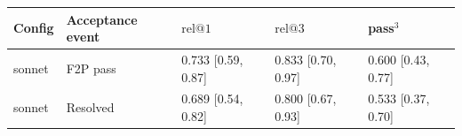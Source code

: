 \begin{tabularx}{\linewidth}{@{}l l X X X@{}}
\toprule
Config & Acceptance event & $\mathrm{rel}@1$ & $\mathrm{rel}@3$ & pass$^3$ \\
\midrule
sonnet & F2P pass & 0.733 [0.59, 0.87] & 0.833 [0.70, 0.97] & 0.600 [0.43, 0.77] \\
sonnet & Resolved & 0.689 [0.54, 0.82] & 0.800 [0.67, 0.93] & 0.533 [0.37, 0.70] \\
\bottomrule
\end{tabularx}
